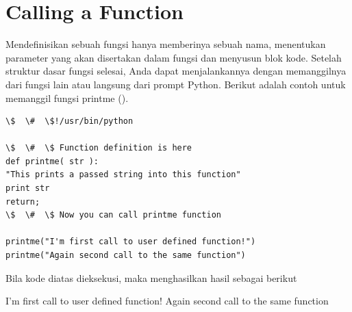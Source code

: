 \section{Calling a Function} 
Mendefinisikan sebuah fungsi hanya memberinya sebuah nama, menentukan parameter yang akan disertakan dalam fungsi dan menyusun blok kode. Setelah struktur dasar fungsi selesai, Anda dapat menjalankannya dengan memanggilnya dari fungsi lain atau langsung dari prompt Python. Berikut adalah contoh untuk memanggil fungsi printme ().
\begin{verbatim}
\$  \#  \$!/usr/bin/python 

\$  \#  \$ Function definition is here
def printme( str ): 
"This prints a passed string into this function" 
print str
return; 
\$  \#  \$ Now you can call printme function

printme("I'm first call to user defined function!")
printme("Again second call to the same function") 
\end{verbatim}
Bila kode diatas dieksekusi, maka menghasilkan hasil sebagai berikut 

I'm first call to user defined function! 
Again second call to the same function 


